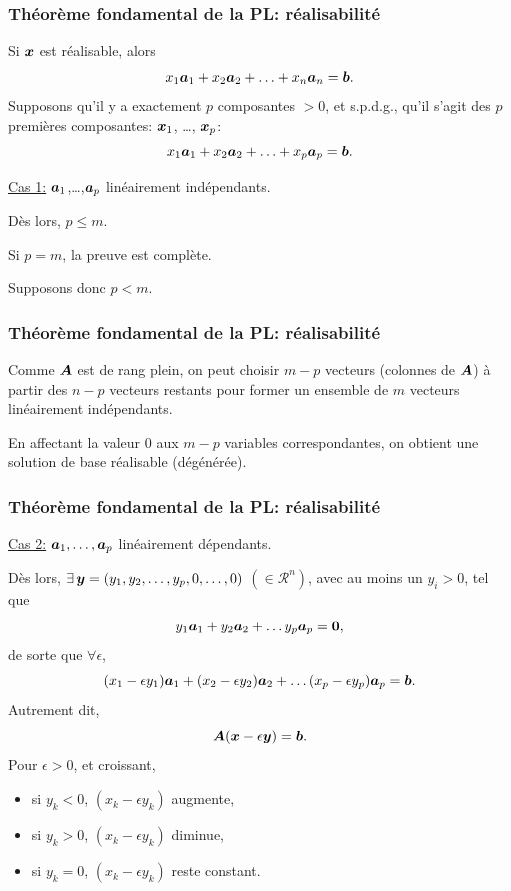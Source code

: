 \documentclass[usepdftitle=false]{beamer}
\begin{document}
\begin{frame}
\frametitle{Théorème fondamental de la PL: réalisabilité}

Si ${\boldsymbol{x}}$ est réalisable, alors
\[
x_1 {\boldsymbol{a}}_1 + x_2 {\boldsymbol{a}}_2 + \ldots + x_n {\boldsymbol{a}}_n = {\boldsymbol{b}}.
\]
Supposons qu'il y a exactement $p$ composantes $> 0$, et s.p.d.g., qu'il s'agit des $p$ premières composantes: ${\boldsymbol{x}}_1$, \ldots, ${\boldsymbol{x}}_p$:
\[
x_1 {\boldsymbol{a}}_1 + x_2 {\boldsymbol{a}}_2 + \ldots + x_p {\boldsymbol{a}}_p = {\boldsymbol{b}}.
\]

\mbox{}

\underline{Cas 1:} ${\boldsymbol{a}}_1$,\ldots,${\boldsymbol{a}}_p$ linéairement indépendants.

Dès lors, $p \leq m$.

Si $p = m$, la preuve est complète.

Supposons donc $p < m$.
\end{frame}

\begin{frame}
\frametitle{Théorème fondamental de la PL: réalisabilité}

Comme ${\boldsymbol{A}}$ est de rang plein, on peut choisir $m-p$ vecteurs (colonnes de ${\boldsymbol{A}}$) à partir des $n-p$ vecteurs restants pour former un ensemble de $m$ vecteurs linéairement indépendants.

\mbox{}

En affectant la valeur 0 aux $m-p$ variables correspondantes, on obtient une solution de base réalisable (dégénérée). 
\end{frame}

\begin{frame}
\frametitle{Théorème fondamental de la PL: réalisabilité}

\underline{Cas 2:} ${\boldsymbol{a}}_1,\ldots,{\boldsymbol{a}}_p$ linéairement dépendants.

Dès lors, $\exists\, {\boldsymbol{y}} = (y_1, y_2,\ldots, y_p,0,\ldots,0)$ $(\in \mathcal{R}^n)$, avec au moins un $y_i > 0$, tel que
$$
y_1 {\boldsymbol{a}}_1 + y_2 {\boldsymbol{a}}_2 + \ldots y_p {\boldsymbol{a}}_p = {\boldsymbol{0}},
$$
de sorte que $\forall \epsilon$,
$$
(x_1 - \epsilon y_1) {\boldsymbol{a}}_1 + (x_2 - \epsilon y_2) {\boldsymbol{a}}_2 + \ldots (x_p - \epsilon y_p) {\boldsymbol{a}}_p = {\boldsymbol{b}}.
$$
Autrement dit,
\[
{\boldsymbol{A}}({\boldsymbol{x}}-\epsilon {\boldsymbol{y}}) = {\boldsymbol{b}}.
\]
Pour $\epsilon > 0$, et croissant,
\begin{itemize}
\item 
si $y_k < 0$, $(x_k - \epsilon y_k)$ augmente,
\item 
si $y_k > 0$, $(x_k - \epsilon y_k)$ diminue,
\item 
si $y_k = 0$, $(x_k - \epsilon y_k)$ reste constant.
\end{itemize}
\end{frame}
\end{document}
